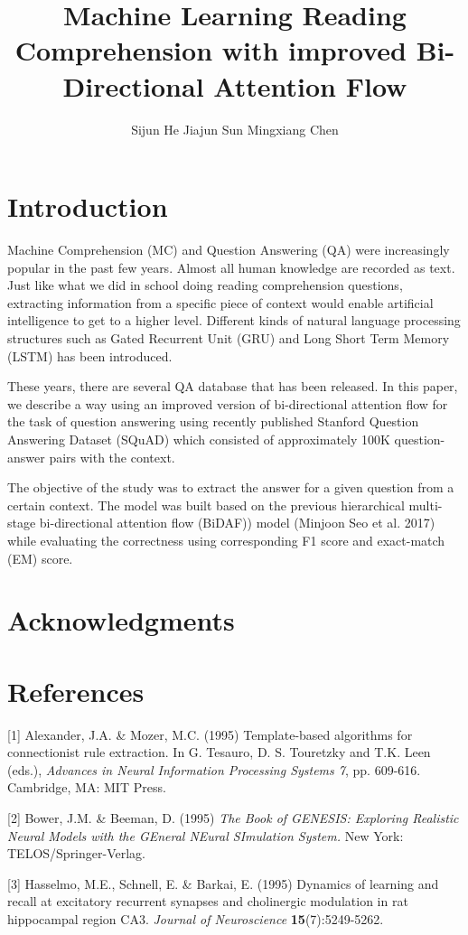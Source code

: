 \documentclass{article} %
\title{Machine Learning Reading Comprehension with improved Bi-Directional Attention Flow}
\author{
Sijun He
\And
Jiajun Sun
\And
Mingxiang Chen
}
\begin{document}
\maketitle

\begin{abstract}

\end{abstract}

\section{Introduction}
Machine Comprehension (MC) and Question Answering (QA) were increasingly popular in the past few years. Almost all human knowledge are recorded as text. Just like what we did in school doing reading comprehension questions, extracting information from a specific piece of context would enable artificial intelligence to get to a higher level. Different kinds of natural language processing structures such as Gated Recurrent Unit (GRU) and Long Short Term Memory (LSTM) has been introduced.

These years, there are several QA database that has been released. In this paper, we describe a way using an improved version of bi-directional attention flow for the task of question answering using recently published Stanford Question Answering Dataset (SQuAD) which consisted of approximately 100K question-answer pairs with the context.

The objective of the study was to extract the answer for a given question from a certain context. The model was built based on the previous hierarchical multi-stage bi-directional attention flow (BiDAF)) model (Minjoon Seo et al. 2017) while evaluating the correctness using corresponding F1 score and exact-match (EM) score.

\section*{Acknowledgments}


\section*{References}


\small{
[1] Alexander, J.A. \& Mozer, M.C. (1995) Template-based algorithms
for connectionist rule extraction. In G. Tesauro, D. S. Touretzky
and T.K. Leen (eds.), {\it Advances in Neural Information Processing
Systems 7}, pp. 609-616. Cambridge, MA: MIT Press.

[2] Bower, J.M. \& Beeman, D. (1995) {\it The Book of GENESIS: Exploring
Realistic Neural Models with the GEneral NEural SImulation System.}
New York: TELOS/Springer-Verlag.

[3] Hasselmo, M.E., Schnell, E. \& Barkai, E. (1995) Dynamics of learning
and recall at excitatory recurrent synapses and cholinergic modulation
in rat hippocampal region CA3. {\it Journal of Neuroscience}
{\bf 15}(7):5249-5262.
}
\end{document}
